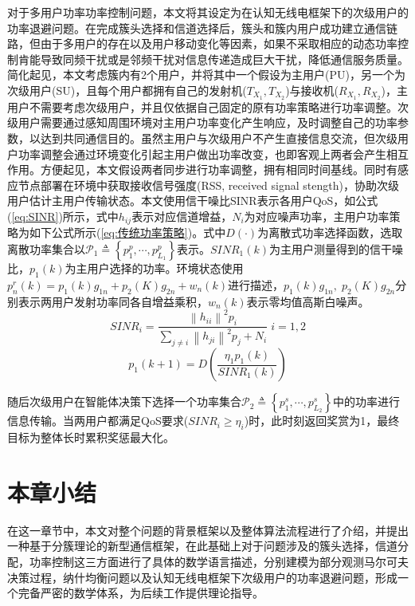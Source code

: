 对于多用户功率功率控制问题，本文将其设定为在认知无线电框架下的次级用户的功率退避问题。在完成簇头选择和信道选择后，簇头和簇内用户成功建立通信链路，但由于多用户的存在以及用户移动变化等因素，如果不采取相应的动态功率控制肯能导致同频干扰或是邻频干扰对信息传递造成巨大干扰，降低通信服务质量。简化起见，本文考虑簇内有2个用户，并将其中一个假设为主用户(PU)，另一个为次级用户(SU)，且每个用户都拥有自己的发射机($T_{X_{1}},T_{X_{2}}$)与接收机($R_{X_{1}},R_{X_{2}}$)，主用户不需要考虑次级用户，并且仅依据自己固定的原有功率策略进行功率调整。次级用户需要通过感知周围环境对主用户功率变化产生响应，及时调整自己的功率参数，以达到共同通信目的。虽然主用户与次级用户不产生直接信息交流，但次级用户功率调整会通过环境变化引起主用户做出功率改变，也即客观上两者会产生相互作用。方便起见，本文假设两者同步进行功率调整，拥有相同时间基线。同时有感应节点部署在环境中获取接收信号强度(RSS, received signal stength)，协助次级用户估计主用户传输状态。本文使用信干噪比SINR表示各用户QoS，如公式(\ref{eq:SINR})所示，式中$h_{ij}$表示对应信道增益，$N_{i}$为对应噪声功率，主用户功率策略\cite{Grandhi1998Constrained}为如下公式所示(\ref{eq:传统功率策略})。式中$D\left ( \cdot  \right )$为离散式功率选择函数，选取离散功率集合以$\mathcal{P}_{1}\triangleq\left \{ p_{1}^{p},\cdots,p_{L_{1}}^{p} \right \}$表示。$SINR_{1}(k)$为主用户测量得到的信干噪比，$p_{1}(k)$为主用户选择的功率。环境状态使用$p_{n}^{r}(k)=p_{1}(k)g_{1n}+p_{2}(K)g_{2n}+w_{n}(k)$进行描述，$p_{1}(k)g_{1n},\;p_{2}(K)g_{2n}$分别表示两用户发射功率同各自增益乘积，$w_{n}(k)$表示零均值高斯白噪声。
\begin{equation}\label{eq:SINR}
SINR_{i}=\frac{\left \| h_{ii} \right \|^{2}p_{i}}{\sum_{j\neq i}\left \| h_{ji} \right \|^2p_{j}+N_{i}}\; i=1,2 
\end{equation}
\begin{equation}\label{eq:传统功率策略}
p_{1}\left ( k+1 \right )=D\left ( \frac{\eta _{1}p_{1}\left ( k \right )}{SINR_{1}\left ( k \right )} \right )
\end{equation}

随后次级用户在智能体决策下选择一个功率集合$\mathcal{P}_{2}\triangleq\left \{ p_{1}^{s},\cdots,p_{L_{2}}^{s} \right \}$中的功率进行信息传输。当两用户都满足QoS要求($SINR_{i}\geqslant\eta_{i}$)时，此时刻返回奖赏为1，最终目标为整体长时累积奖惩最大化。
\section{本章小结}
在这一章节中，本文对整个问题的背景框架以及整体算法流程进行了介绍，并提出一种基于分簇理论的新型通信框架，在此基础上对于问题涉及的簇头选择，信道分配，功率控制这三方面进行了具体的数学语言描述，分别建模为部分观测马尔可夫决策过程，纳什均衡问题以及认知无线电框架下次级用户的功率退避问题，形成一个完备严密的数学体系，为后续工作提供理论指导。









